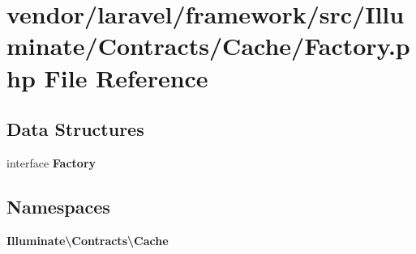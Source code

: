 \section{vendor/laravel/framework/src/\+Illuminate/\+Contracts/\+Cache/\+Factory.php File Reference}
\label{laravel_2framework_2src_2_illuminate_2_contracts_2_cache_2_factory_8php}
\subsection*{Data Structures}
\begin{DoxyCompactItemize}
\item 
interface {\bf Factory}
\end{DoxyCompactItemize}
\subsection*{Namespaces}
\begin{DoxyCompactItemize}
\item 
 {\bf Illuminate\textbackslash{}\+Contracts\textbackslash{}\+Cache}
\end{DoxyCompactItemize}
